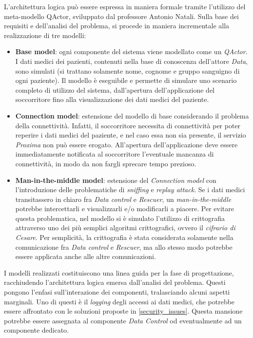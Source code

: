 \documentclass[a4paper,12pt]{report}
\begin{document}
L'architettura logica può essere espressa in maniera formale tramite l’utilizzo del meta-modello
QActor, sviluppato dal professore Antonio Natali. Sulla base dei requisiti e dell'analisi del problema, si procede in maniera incrementale alla realizzazione di tre modelli:
\begin{itemize}
	\item \textbf{Base model}: ogni componente del sistema viene modellato come un \emph{QActor}. I dati medici dei pazienti, contenuti nella base di conoscenza dell'attore \emph{Data}, sono simulati (si trattano solamente nome, cognome e gruppo sanguigno di ogni paziente). Il modello è eseguibile e permette di simulare uno scenario completo di utilizzo del sistema, dall'apertura dell'applicazione del soccorritore fino alla visualizzazione dei dati medici del paziente.
	\item \textbf{Connection model}: estensione del modello di base considerando il problema della connettività. Infatti, il soccorritore necessita di connettività per poter reperire i dati medici del paziente, e nel caso essa non sia presente, il servizio \emph{Proxima} non può essere erogato. All'apertura dell'applicazione deve essere immediatamente notificata al soccorritore l'eventuale mancanza di connettività, in modo da non fargli sprecare tempo prezioso.
	\item \textbf{Man-in-the-middle model}: estensione del \emph{Connection model} con l'introduzione delle problematiche di \emph{sniffing} e \emph{replay attack}. Se i dati medici transitassero in chiaro fra \emph{Data control} e \emph{Rescuer}, un \emph{man-in-the-middle} potrebbe intercettarli e visualizzarli e/o modificarli a piacere. Per evitare questa problematica, nel modello si è simulato l'utilizzo di crittografia attraverso uno dei più semplici algoritmi crittografici, ovvero il \emph{cifrario di Cesare}. Per semplicità, la crittografia è stata considerata solamente nella comunicazione fra \emph{Data control} e \emph{Rescuer}, ma allo stesso modo potrebbe essere applicata anche alle altre comunicazioni.
\end{itemize}

I modelli realizzati costituiscono una linea guida per la fase di progettazione, racchiudendo l'architettura logica emersa dall'analisi del problema. Questi pongono l'enfasi sull'interazione dei componenti, tralasciando alcuni aspetti marginali. Uno di questi è il \emph{logging} degli accessi ai dati medici, che potrebbe essere affrontato con le soluzioni proposte in \autoref{security_issues}. Questa mansione potrebbe essere assegnata al componente \emph{Data Control} od eventualmente ad un componente dedicato. 
\end{document}
